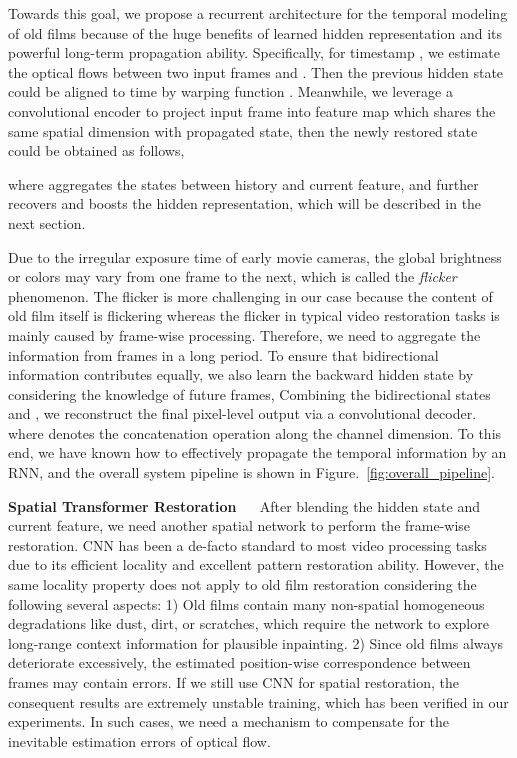 \documentclass[10pt,twocolumn,letterpaper]{article}
\begin{document}
	Towards this goal, we propose a recurrent architecture for the temporal modeling of old films because of the huge benefits of learned hidden representation and its powerful long-term propagation ability.  Specifically, for timestamp , we estimate the optical flows  between two input frames  and . Then the previous hidden state  could be aligned to time  by warping function . Meanwhile, we leverage a convolutional encoder  to project input frame  into feature map  which shares the same spatial dimension with propagated state, then the newly restored state  could be obtained as follows,
	
	where  aggregates the states between history and current feature, and  further recovers and boosts the hidden representation, which will be described in the next section.
	
	Due to the irregular exposure time of early movie cameras, the global brightness or colors may vary from one frame to the next, which is called the \textit{flicker} phenomenon. The flicker is more challenging in our case because the content of old film itself is flickering whereas the flicker in typical video restoration tasks is mainly caused by frame-wise processing. Therefore, we need to aggregate the information from frames in a long period. To ensure that bidirectional information contributes equally, we also learn the backward hidden state  by considering the knowledge of future frames, 
	Combining the bidirectional states  and , we reconstruct the final pixel-level output via a convolutional decoder. 
	where  denotes the concatenation operation along the channel dimension. To this end, we have known how to effectively propagate the temporal information by an RNN, and the overall system pipeline is shown in Figure.~\ref{fig:overall_pipeline}.
	
	
	\noindent\textbf{Spatial Transformer Restoration} ~~ After blending the hidden state and current feature, we need another spatial network to perform the frame-wise restoration. CNN has been a de-facto standard to most video processing tasks due to its efficient locality and excellent pattern restoration ability. However, the same locality property does not apply to old film restoration considering the following several aspects: 1) Old films contain many non-spatial homogeneous degradations like dust, dirt, or scratches, which require the network to explore long-range context information for plausible inpainting. 2) Since old films always deteriorate excessively, the estimated position-wise correspondence between frames may contain errors. If we still use CNN for spatial restoration, the consequent results are extremely unstable training, which has been verified in our experiments. In such cases, we need a mechanism to compensate for the inevitable estimation errors of optical flow.
	
\end{document}
